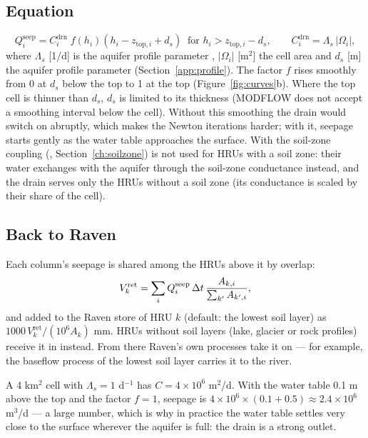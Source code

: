 \subsection{Equation}
\begin{equation}
Q^{\mathrm{seep}}_i=C^{\mathrm{drn}}_i\;f\!\left(h_i\right)\left(h_i-z_{\mathrm{top},i}+d_s\right)\ \text{ for } h_i>z_{\mathrm{top},i}-d_s,
\qquad C^{\mathrm{drn}}_i=\Lambda_s\,|\Omega_i| ,
\end{equation}
where $\Lambda_s$ [1/d] is the aquifer profile parameter , $|\Omega_i|$ [m$^2$] the cell area and $d_s$ [m] the aquifer profile parameter  (Section~\ref{app:profile}).
The factor $f$ rises smoothly from 0 at $d_s$ below the top to 1 at the top (Figure~\ref{fig:curves}b). Where the top cell is
thinner than $d_s$, $d_s$ is limited to its thickness (MODFLOW does not accept a smoothing interval below the cell). Without this
smoothing the drain would switch on abruptly, which makes the Newton iterations harder; with it, seepage starts gently
as the water table approaches the surface. With the soil-zone coupling (, Section~\ref{ch:soilzone})
 is not used for HRUs with a soil zone: their water exchanges with the aquifer through the soil-zone
conductance instead, and the drain serves only the HRUs without a soil zone (its conductance is scaled by their share of the cell).

\subsection{Back to Raven}
Each column's seepage is shared among the HRUs above it by overlap:
\begin{equation}
V^{\mathrm{ret}}_k=\sum_i Q^{\mathrm{seep}}_i\,\Delta t\,\frac{A_{k,i}}{\sum_{k'}A_{k',i}},
\end{equation}
and added to the Raven store  of HRU $k$ (default: the lowest soil layer) as
$1000\,V^{\mathrm{ret}}_k/(10^{6}A_k)$ mm. HRUs without soil layers (lake, glacier or rock profiles) receive it in
 instead. From there Raven's own processes take it on --- for example, the baseflow process of the
lowest soil layer carries it to the river.
\begin{example}[: seepage]
A 4 km$^2$ cell with $\Lambda_s=1$ d$^{-1}$ has $C=4\times10^6$ m$^2$/d. With the water table 0.1 m above the top and the
factor $f=1$, seepage is $4\times10^6\times(0.1+0.5)\approx2.4\times10^6$ m$^3$/d --- a large number, which is why in
practice the water table settles very close to the surface wherever the aquifer is full: the drain is a strong outlet.
\end{example}

